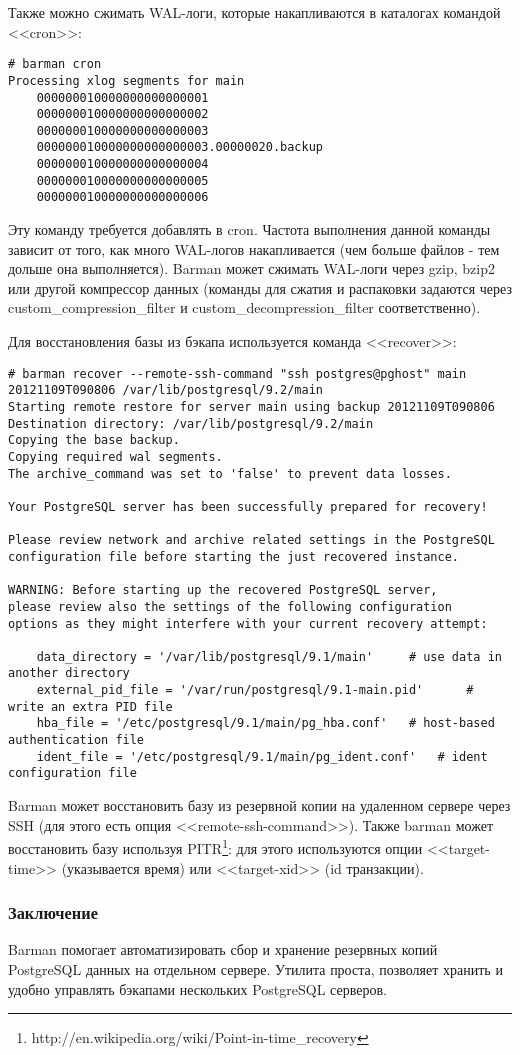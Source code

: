 Также можно сжимать WAL-логи, которые накапливаются в каталогах командой <<cron>>:

\begin{lstlisting}[label=lst:barman16,caption=Архивирование WAL-логов]
# barman cron
Processing xlog segments for main
	000000010000000000000001
	000000010000000000000002
	000000010000000000000003
	000000010000000000000003.00000020.backup
	000000010000000000000004
	000000010000000000000005
	000000010000000000000006
\end{lstlisting}

Эту команду требуется добавлять в cron. Частота выполнения данной команды зависит от того, как много WAL-логов накапливается (чем больше файлов - тем дольше она выполняется). Barman может сжимать WAL-логи через gzip, bzip2 или другой компрессор данных (команды для сжатия и распаковки задаются через custom\_compression\_filter и custom\_decompression\_filter соответственно).

Для восстановления базы из бэкапа используется команда <<recover>>:

\begin{lstlisting}[label=lst:barman17,caption=Восстановление базы]
# barman recover --remote-ssh-command "ssh postgres@pghost" main 20121109T090806 /var/lib/postgresql/9.2/main
Starting remote restore for server main using backup 20121109T090806 
Destination directory: /var/lib/postgresql/9.2/main
Copying the base backup.
Copying required wal segments.
The archive_command was set to 'false' to prevent data losses.

Your PostgreSQL server has been successfully prepared for recovery!

Please review network and archive related settings in the PostgreSQL
configuration file before starting the just recovered instance.

WARNING: Before starting up the recovered PostgreSQL server,
please review also the settings of the following configuration
options as they might interfere with your current recovery attempt:

    data_directory = '/var/lib/postgresql/9.1/main'		# use data in another directory
    external_pid_file = '/var/run/postgresql/9.1-main.pid'		# write an extra PID file
    hba_file = '/etc/postgresql/9.1/main/pg_hba.conf'	# host-based authentication file
    ident_file = '/etc/postgresql/9.1/main/pg_ident.conf'	# ident configuration file
\end{lstlisting}

Barman может восстановить базу из резервной копии на удаленном сервере через SSH (для этого есть опция <<remote-ssh-command>>). Также barman может восстановить базу используя PITR\footnote{http://en.wikipedia.org/wiki/Point-in-time\_recovery}: для этого используются опции <<target-time>> (указывается время) или <<target-xid>> (id транзакции).

\subsubsection{Заключение}
Barman помогает автоматизировать сбор и хранение резервных копий PostgreSQL данных на отдельном сервере. Утилита проста, позволяет хранить и удобно управлять бэкапами нескольких PostgreSQL серверов.